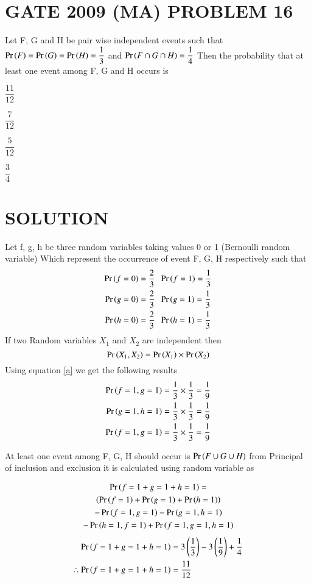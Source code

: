 \documentclass[journal,12pt,twocolumn]{IEEEtran}
\begin{document}
\section{GATE 2009 (MA) PROBLEM 16} 
Let F, G and H be pair wise independent events such that $\Pr\left(F\right)=\Pr\left(G\right)=\Pr\left(H\right)=\dfrac{1}{3}$ 
and $\Pr\left(F \cap G \cap H\right)=\dfrac{1}{4}$ Then the probability that at least one event among F, G and H occurs is 
\begin{enumerate}[(A)]
\begin{multicols}{4}
\setlength\itemsep{2em}
\item $\dfrac{11}{12}$
\item $\dfrac{7}{12}$
\item $\dfrac{5}{12}$
\item $\dfrac{3}{4}$
\end{multicols}
\end{enumerate}

\section{SOLUTION}
Let f, g, h be three random variables taking values 0 or 1 (Bernoulli random variable) Which 
represent the occurrence of event F, G, H respectively such that 
\begin{align*}
\Pr\left(f=0\right) = \dfrac{2}{3}\;&\;\Pr\left(f=1\right) = \dfrac{1}{3} \\
\Pr\left(g=0\right) = \dfrac{2}{3}\;&\;\Pr\left(g=1\right) = \dfrac{1}{3} \\
\Pr\left(h=0\right) = \dfrac{2}{3}\;&\;\Pr\left(h=1\right) = \dfrac{1}{3} \\
\end{align*}
If two Random variables $X_1$ and $X_2$ are independent then 
\begin{equation}
\Pr\left(X_1,X_2\right) = \Pr\left(X_1\right) \times \Pr\left(X_2\right) \label{a}
\end{equation}
Using equation \eqref{a} we get the following results 
\begin{align*}
\Pr\left(f=1,g=1\right) &= \dfrac{1}{3} \times \dfrac{1}{3} = \dfrac{1}{9} \\
\Pr\left(g=1,h=1\right) &= \dfrac{1}{3} \times \dfrac{1}{3} = \dfrac{1}{9} \\
\Pr\left(f=1,g=1\right) &= \dfrac{1}{3} \times \dfrac{1}{3} = \dfrac{1}{9} 
\end{align*}

At least one event among F, G, H should occur is $\Pr\left(F\cup G\cup H\right)$ 
from Principal of inclusion and exclusion it is calculated using random variable as

\begin{multline*}
\Pr\left(f=1 + g=1 + h=1\right) =  \\
\left(\Pr\left(f=1\right) + \Pr\left(g=1\right) + \Pr\left(h=1\right)\right) \\
- \Pr\left(f=1,g=1\right) - \Pr\left(g=1,h=1\right) \\
 - \Pr\left(h=1,f=1\right) + \Pr\left(f=1,g=1,h=1\right)
\end{multline*}
\begin{align*}
\Pr\left(f=1 + g=1 + h=1\right) &= 3\left(\dfrac{1}{3}\right) - 3\left(\dfrac{1}{9}\right) + \dfrac{1}{4} \\
\therefore \Pr\left(f=1 + g=1 + h=1\right) &= \dfrac{11}{12}
\end{align*}
\end{document}
